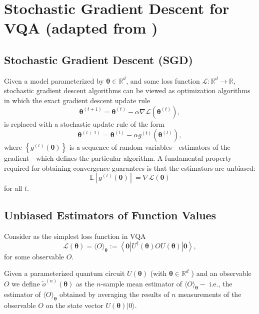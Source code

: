 \documentclass[
        11pt, %
	a4paper, %
]{LegrandOrangeBook}
\begin{document}
\section{Stochastic Gradient Descent for VQA (adapted from \cite{sweke2020stochastic})}

\subsection{Stochastic Gradient Descent (SGD)}

Given a model parameterized by $\boldsymbol{\theta} \in \mathbb{R}^d$, and some loss function $\mathcal{L}: \mathbb{R}^d \rightarrow \mathbb{R}$, stochastic gradient descent algorithms can be viewed as optimization algorithms in which the exact gradient descent update rule
\begin{equation}
    \boldsymbol{\theta}^{(t+1)}=\boldsymbol{\theta}^{(t)}-\alpha \nabla \mathcal{L}\left(\boldsymbol{\theta}^{(t)}\right),
\end{equation}
is replaced with a stochastic update rule of the form
\begin{equation}
    \boldsymbol{\theta}^{(t+1)}=\boldsymbol{\theta}^{(t)}-\alpha g^{(t)}\left(\boldsymbol{\theta}^{(t)}\right),
\end{equation}
where $\left\{g^{(t)}(\boldsymbol{\theta})\right\}$ is a sequence of random variables - estimators of the gradient - which defines the particular algorithm. A fundamental property required for obtaining convergence guarantees is that the estimators are unbiased:
\begin{equation}
    \mathbb{E}\left[g^{(t)}(\boldsymbol{\theta})\right]=\nabla \mathcal{L}(\boldsymbol{\theta})
\end{equation}
for all $t$. 

\subsection{Unbiased Estimators of Function Values}

Consider as the simplest loss function in VQA
\begin{equation}
    \mathcal{L}(\boldsymbol{\theta})=\langle O\rangle_{\boldsymbol{\theta}}:=\left\langle\mathbf{0}\left|U^{\dagger}(\boldsymbol{\theta}) OU(\boldsymbol{\theta})\right| \mathbf{0}\right\rangle,
\end{equation}
for some observable $O$.

\begin{definition}
    Given a parameterized quantum circuit $U(\boldsymbol{\theta})$ (with $\boldsymbol{\theta} \in \mathbb{R}^d$ ) and an observable $O$ we define $\tilde{o}^{(n)}(\boldsymbol{\theta})$ as the $n$-sample mean estimator of $\langle O\rangle_{\boldsymbol{\theta}}-$ i.e., the estimator of $\langle O\rangle_{\boldsymbol{\theta}}$ obtained by averaging the results of $n$ measurements of the observable $O$ on the state vector $U(\boldsymbol{\theta})|0\rangle$.
\end{definition}
\end{document}
